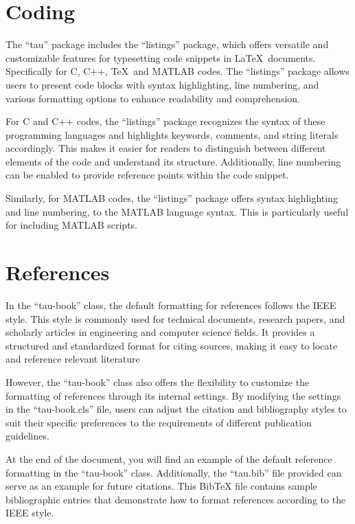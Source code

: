 \documentclass[10pt,a4paper,twoside]{tau-book}
\begin{document}
\section{Coding}

    The ``tau'' package includes the ``listings'' package, which offers versatile and customizable features for typesetting code snippets in \LaTeX\ documents. Specifically for C, C++, \TeX\ and MATLAB codes. The ``listings'' package allows users to present code blocks with syntax highlighting, line numbering, and various formatting options to enhance readability and comprehension.

    For C and C++ codes, the ``listings'' package recognizes the syntax of these programming languages and highlights keywords, comments, and string literals accordingly. This makes it easier for readers to distinguish between different elements of the code and understand its structure. Additionally, line numbering can be enabled to provide reference points within the code snippet.

    

    Similarly, for MATLAB codes, the ``listings'' package offers syntax highlighting and line numbering, to the MATLAB language syntax. This is particularly useful for including MATLAB scripts.
    
    

\section{References}

    In the ``tau-book'' class, the default formatting for references follows the IEEE style. This style is commonly used for technical documents, research papers, and scholarly articles in engineering and computer science fields. It provides a structured and standardized format for citing sources, making it easy to locate and reference relevant literature 

    However, the ``tau-book'' class also offers the flexibility to customize the formatting of references through its internal settings. By modifying the settings in the ``tau-book.cls'' file, users can adjust the citation and bibliography styles to suit their specific preferences to the requirements of different publication guidelines.

    At the end of the document, you will find an example of the default reference formatting in the ``tau-book'' class. Additionally, the ``tau.bib'' file provided can serve as an example for future citations. This BibTeX file contains sample bibliographic entries that demonstrate how to format references according to the IEEE style.
\end{document}
